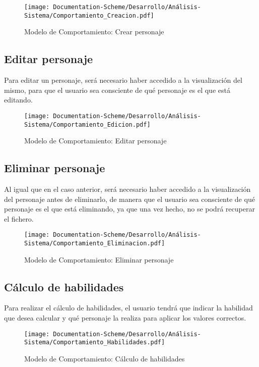 \begin{figure}[H]
    \centering
    \texttt{[image: Documentation-Scheme/Desarrollo/Análisis-Sistema/Comportamiento\_Creacion.pdf]}
    \caption{Modelo de Comportamiento: Crear personaje}
    \label{Comportamiento_creacion_personaje}
\end{figure}

\subsection{Editar personaje}
Para editar un personaje, será necesario haber accedido a la visualización del mismo, para que 
el usuario sea consciente de qué personaje es el que está editando.

\begin{figure}[H]
    \centering
    \texttt{[image: Documentation-Scheme/Desarrollo/Análisis-Sistema/Comportamiento\_Edicion.pdf]}
    \caption{Modelo de Comportamiento: Editar personaje}
    \label{Comportamiento_edicion_personaje}
\end{figure}

\subsection{Eliminar personaje}
Al igual que en el caso anterior, será necesario haber accedido a la visualización del personaje antes de 
eliminarlo, de manera que el usuario sea consciente de qué personaje es el que está eliminando, ya que 
una vez hecho, no se podrá recuperar el fichero.

\begin{figure}[H]
    \centering
    \texttt{[image: Documentation-Scheme/Desarrollo/Análisis-Sistema/Comportamiento\_Eliminacion.pdf]}
    \caption{Modelo de Comportamiento: Eliminar personaje}
    \label{Comportamiento_eliminacion_personaje}
\end{figure}

\subsection{Cálculo de habilidades}
Para realizar el cálculo de habilidades, el usuario tendrá que indicar la habilidad que desea calcular 
y qué personaje la realiza para aplicar los valores correctos.

\begin{figure}[H]
    \centering
    \texttt{[image: Documentation-Scheme/Desarrollo/Análisis-Sistema/Comportamiento\_Habilidades.pdf]}
    \caption{Modelo de Comportamiento: Cálculo de habilidades}
    \label{Comportamiento_habilidades}
\end{figure}